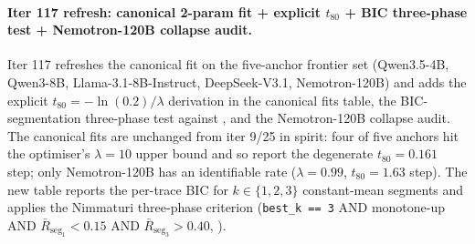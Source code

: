 \paragraph{Iter 117 refresh: canonical 2-param fit + explicit $t_{80}$ + BIC three-phase test + Nemotron-120B collapse audit.}
\label{par:scaling-iter117}
Iter 117 refreshes the canonical fit on the five-anchor frontier set
(Qwen3.5-4B, Qwen3-8B, Llama-3.1-8B-Instruct, DeepSeek-V3.1,
Nemotron-120B) and adds the explicit $t_{80}=-\ln(0.2)/\lambda$
derivation in the canonical fits table, the BIC-segmentation
three-phase test against \citet{nimmaturi2025predictive}, and the
Nemotron-120B collapse audit.  The canonical fits are unchanged from
iter 9/25 in spirit: four of five anchors hit the optimiser's
$\lambda = 10$ upper bound and so report the degenerate
$t_{80} = 0.161$ step; only Nemotron-120B has an identifiable rate
($\lambda = 0.99$, $t_{80} = 1.63$ step).  The new table reports the
per-trace BIC for $k \in \{1,2,3\}$ constant-mean segments and
applies the Nimmaturi three-phase criterion
(\texttt{best\_k == 3} AND monotone-up AND
$\bar R_{\text{seg}_1} < 0.15$ AND $\bar R_{\text{seg}_3} > 0.40$,
).

\begin{table}[t]
  \centering
  \small
  \caption{\textbf{Iter 117 BIC-segmentation three-phase test against
    \citet{nimmaturi2025predictive}.}
    $\Delta$BIC$_{3v1}$ is the BIC difference between $k=3$ and
    $k=1$ segmentations; negative values mean the 3-segment model
    is preferred.  All five anchors prefer either $k=1$ (Qwen3-8B)
    or $k=3$ with non-monotone segments.  \emph{None of the five
    anchors pass the Nimmaturi three-phase criterion}, because
    (i)~Qwen3-8B's BIC-optimal $k=1$ has no slow-start phase, and
    (ii)~the four $k=3$ winners all have non-monotone segment means
    (rise-then-fall) so they fail the monotone-up requirement.
    Nemotron-120B is the only anchor whose peak-vs-late contrast
    ($0.875$ vs $0.154$ over the post-peak BIC segment) is large
    enough to warrant the collapse label.
    \texttt{scripts/scaling\_law\_fit.py} $\to$
    \texttt{scaling\_law\_three\_phase.tsv}.}
  \label{tab:scaling-iter117-bic}
\end{table}

